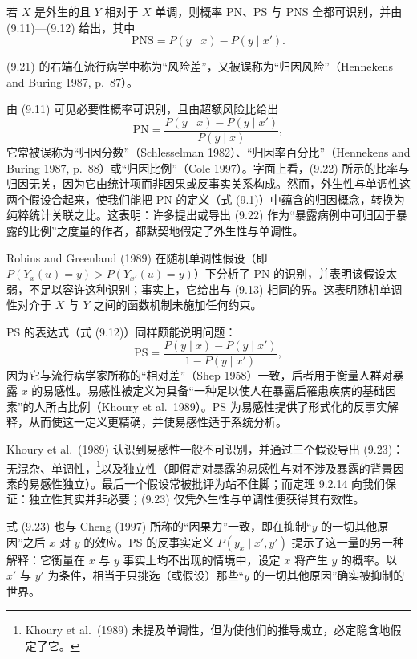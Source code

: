 \begin{theorem}[外生性与单调性下的可识别性]
若 $X$ 是外生的且 $Y$ 相对于 $X$ 单调，则概率 PN、PS 与 PNS 全都可识别，并由 \textup{(9.11)}—\textup{(9.12)} 给出，其中
\begin{equation}
\mathrm{PNS}=P(y\mid x)-P(y\mid x'). \tag{9.21}
\end{equation}
\end{theorem}

\textup{(9.21)} 的右端在流行病学中称为“风险差”，又被误称为“归因风险”（Hennekens and Buring 1987, p.~87）。

由 \textup{(9.11)} 可见必要性概率可识别，且由超额风险比给出
\begin{equation}
\mathrm{PN}=\frac{P(y\mid x)-P(y\mid x')}{P(y\mid x)}, \tag{9.22}
\end{equation}
它常被误称为“归因分数”（Schlesselman 1982）、“归因率百分比”（Hennekens and Buring 1987, p.~88）或“归因比例”（Cole 1997）。字面上看，\textup{(9.22)} 所示的比率与归因无关，因为它由统计项而非因果或反事实关系构成。然而，外生性与单调性这两个假设合起来，使我们能把 PN 的定义（式 \textup{(9.1)}）中蕴含的归因概念，转换为纯粹统计关联之比。这表明：许多提出或导出 \textup{(9.22)} 作为“暴露病例中可归因于暴露的比例”之度量的作者，都默契地假定了外生性与单调性。

Robins and Greenland (1989) 在随机单调性假设（即 $P(Y_x(u)=y)>P(Y_{x'}(u)=y)$）下分析了 PN 的识别，并表明该假设太弱，不足以容许这种识别；事实上，它给出与 \textup{(9.13)} 相同的界。这表明随机单调性对介于 $X$ 与 $Y$ 之间的函数机制未施加任何约束。

PS 的表达式（式 \textup{(9.12)}）同样颇能说明问题：
\begin{equation}
\mathrm{PS}=\frac{P(y\mid x)-P(y\mid x')}{1-P(y\mid x')}, \tag{9.23}
\end{equation}
因为它与流行病学家所称的“相对差”（Shep 1958）一致，后者用于衡量人群对暴露 $x$ 的易感性。易感性被定义为具备“一种足以使人在暴露后罹患疾病的基础因素”的人所占比例（Khoury et al.\ 1989）。PS 为易感性提供了形式化的反事实解释，从而使这一定义更精确，并使易感性适于系统分析。

Khoury et al.\ (1989) 认识到易感性一般不可识别，并通过三个假设导出 \textup{(9.23)}：无混杂、单调性，\footnote{Khoury et al.\ (1989) 未提及单调性，但为使他们的推导成立，必定隐含地假定了它。}以及独立性（即假定对暴露的易感性与对不涉及暴露的背景因素的易感性独立）。最后一个假设常被批评为站不住脚；而定理 9.2.14 向我们保证：独立性其实并非必要；\textup{(9.23)} 仅凭外生性与单调性便获得其有效性。

式 \textup{(9.23)} 也与 Cheng (1997) 所称的“因果力”一致，即在抑制“$y$ 的一切其他原因”之后 $x$ 对 $y$ 的效应。PS 的反事实定义 $P(y_x\mid x',y')$ 提示了这一量的另一种解释：它衡量在 $x$ 与 $y$ 事实上均不出现的情境中，设定 $x$ 将产生 $y$ 的概率。以 $x'$ 与 $y'$ 为条件，相当于只挑选（或假设）那些“$y$ 的一切其他原因”确实被抑制的世界。

